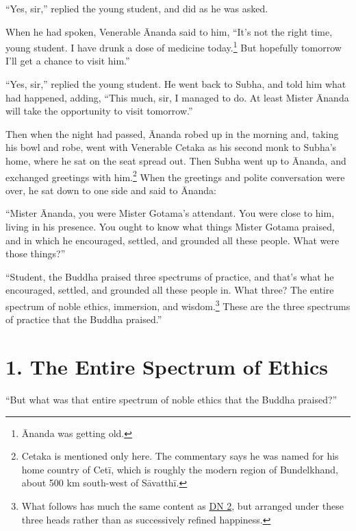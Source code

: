 \documentclass[12pt,openany]{book}%
\begin{document}
“Yes, sir,” replied the young student, and did as he was asked. 

When he had spoken, Venerable Ānanda said to him, “It’s not the right time, young student. I have drunk a dose of medicine today.\footnote{Ānanda was getting old. } But hopefully tomorrow I’ll get a chance to visit him.” 

“Yes, sir,” replied the young student. He went back to Subha, and told him what had happened, adding, “This much, sir, I managed to do. At least Mister Ānanda will take the opportunity to visit tomorrow.” 

Then when the night had passed, Ānanda robed up in the morning and, taking his bowl and robe, went with Venerable Cetaka as his second monk to Subha’s home, where he sat on the seat spread out. Then Subha went up to Ānanda, and exchanged greetings with him.\footnote{Cetaka is mentioned only here. The commentary says he was named for his home country of \textsanskrit{Cetī}, which is roughly the modern region of Bundelkhand, about 500 km south-west of \textsanskrit{Sāvatthī}. } When the greetings and polite conversation were over, he sat down to one side and said to Ānanda: 

“Mister Ānanda, you were Mister Gotama’s attendant. You were close to him, living in his presence. You ought to know what things Mister Gotama praised, and in which he encouraged, settled, and grounded all these people. What were those things?” 

“Student, the Buddha praised three spectrums of practice, and that’s what he encouraged, settled, and grounded all these people in. What three? The entire spectrum of noble ethics, immersion, and wisdom.\footnote{What follows has much the same content as \href{https://suttacentral.net/dn2/en/sujato}{DN 2}, but arranged under these three heads rather than as successively refined happiness. } These are the three  spectrums of practice that the Buddha praised.” 

\section*{1. The Entire Spectrum of Ethics }

“But what was that entire spectrum of noble ethics that the Buddha praised?” 
\end{document}

